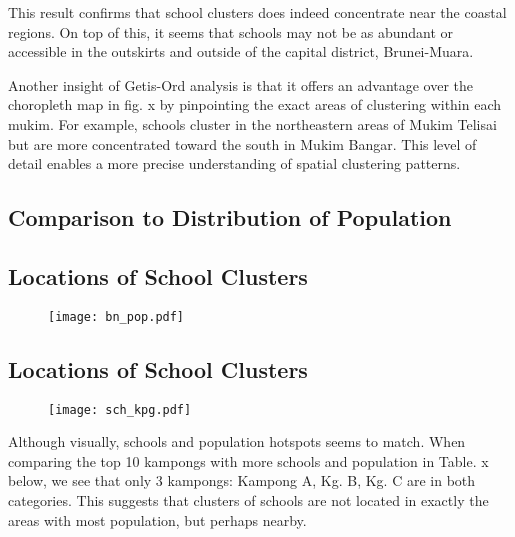 \documentclass[12pt]{article}
\begin{document}
This result confirms that school clusters does indeed concentrate near the coastal regions. On top of this, it seems that schools may not be as abundant or accessible in the outskirts and outside of the capital district, Brunei-Muara. 

Another insight of Getis-Ord analysis is that it offers an advantage over the choropleth map in fig. x by pinpointing the exact areas of clustering within each mukim. For example, schools cluster in the northeastern areas of Mukim Telisai but are more concentrated toward the south in Mukim Bangar. This level of detail enables a more precise understanding of spatial clustering patterns. 

\subsection{Comparison to Distribution of Population}
\subsection{Locations of School Clusters}
\begin{figure}[htbp]
\centering
\texttt{[image: bn\_pop.pdf]}
\end{figure} 

\subsection{Locations of School Clusters}
\begin{figure}[htbp]
\centering
\texttt{[image: sch\_kpg.pdf]}
\end{figure} 

Although visually, schools and population hotspots seems to match. When comparing the top 10 kampongs with more schools and population in Table. x below, we see that only 3 kampongs: Kampong A, Kg. B, Kg. C are in both categories. This suggests that clusters of schools are not located in exactly the areas with most population, but perhaps nearby. 
\end{document}
